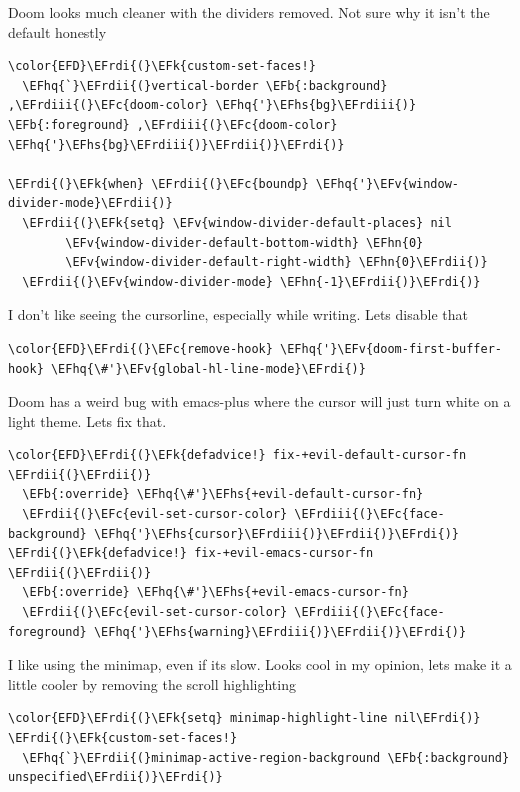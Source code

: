 \documentclass{scrartcl}
\newcommand{\EFk}[1]{\textcolor{EFk}{#1}} %
\newcommand{\EFb}[1]{\textcolor{EFb}{#1}} %
\newcommand{\EFc}[1]{\textcolor{EFc}{#1}} %
\newcommand{\EFv}[1]{\textcolor{EFv}{#1}} %
\newcommand{\EFhn}[1]{\textcolor{EFhn}{\textbf{#1}}} %
\newcommand{\EFhq}[1]{\textcolor{EFhq}{#1}} %
\newcommand{\EFhs}[1]{\textcolor{EFhs}{#1}} %
\newcommand{\EFrdi}[1]{\textcolor{EFrdi}{#1}} %
\newcommand{\EFrdii}[1]{\textcolor{EFrdii}{#1}} %
\newcommand{\EFrdiii}[1]{\textcolor{EFrdiii}{#1}} %
\begin{document}
Doom looks much cleaner with the dividers removed. Not sure why it isn't the default honestly
\begin{Code}
\begin{Verbatim}[]
\color{EFD}\EFrdi{(}\EFk{custom-set-faces!}
  \EFhq{`}\EFrdii{(}vertical-border \EFb{:background} ,\EFrdiii{(}\EFc{doom-color} \EFhq{'}\EFhs{bg}\EFrdiii{)} \EFb{:foreground} ,\EFrdiii{(}\EFc{doom-color} \EFhq{'}\EFhs{bg}\EFrdiii{)}\EFrdii{)}\EFrdi{)}

\EFrdi{(}\EFk{when} \EFrdii{(}\EFc{boundp} \EFhq{'}\EFv{window-divider-mode}\EFrdii{)}
  \EFrdii{(}\EFk{setq} \EFv{window-divider-default-places} nil
        \EFv{window-divider-default-bottom-width} \EFhn{0}
        \EFv{window-divider-default-right-width} \EFhn{0}\EFrdii{)}
  \EFrdii{(}\EFv{window-divider-mode} \EFhn{-1}\EFrdii{)}\EFrdi{)}
\end{Verbatim}
\end{Code}

I don't like seeing the cursorline, especially while writing. Lets disable that
\begin{Code}
\begin{Verbatim}[]
\color{EFD}\EFrdi{(}\EFc{remove-hook} \EFhq{'}\EFv{doom-first-buffer-hook} \EFhq{\#'}\EFv{global-hl-line-mode}\EFrdi{)}
\end{Verbatim}
\end{Code}

Doom has a weird bug with emacs-plus where the cursor will just turn white on a light theme. Lets fix that.
\begin{Code}
\begin{Verbatim}[]
\color{EFD}\EFrdi{(}\EFk{defadvice!} fix-+evil-default-cursor-fn \EFrdii{(}\EFrdii{)}
  \EFb{:override} \EFhq{\#'}\EFhs{+evil-default-cursor-fn}
  \EFrdii{(}\EFc{evil-set-cursor-color} \EFrdiii{(}\EFc{face-background} \EFhq{'}\EFhs{cursor}\EFrdiii{)}\EFrdii{)}\EFrdi{)}
\EFrdi{(}\EFk{defadvice!} fix-+evil-emacs-cursor-fn \EFrdii{(}\EFrdii{)}
  \EFb{:override} \EFhq{\#'}\EFhs{+evil-emacs-cursor-fn}
  \EFrdii{(}\EFc{evil-set-cursor-color} \EFrdiii{(}\EFc{face-foreground} \EFhq{'}\EFhs{warning}\EFrdiii{)}\EFrdii{)}\EFrdi{)}
\end{Verbatim}
\end{Code}

I like using the minimap, even if its slow. Looks cool in my opinion, lets make it a little cooler by removing the scroll highlighting
\begin{Code}
\begin{Verbatim}[]
\color{EFD}\EFrdi{(}\EFk{setq} minimap-highlight-line nil\EFrdi{)}
\EFrdi{(}\EFk{custom-set-faces!}
  \EFhq{`}\EFrdii{(}minimap-active-region-background \EFb{:background} unspecified\EFrdii{)}\EFrdi{)}
\end{Verbatim}
\end{Code}
\end{document}
